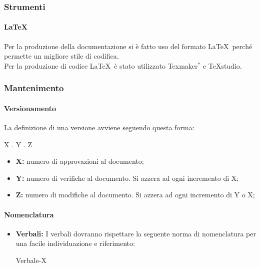 \documentclass[11pt,a4paper]{article}
\begin{document}
{	\subsubsection{Strumenti}
	
	\paragraph{\LaTeX\\}
	 Per la produzione della documentazione si è fatto uso del formato \LaTeX\ perché permette un migliore stile di codifica.\\
	Per la produzione di codice \LaTeX\ è stato utilizzato Texmaker$^*$ e TeXstudio.
	
	\subsubsection{Mantenimento}
	
	\paragraph{Versionamento\\}
	La definizione di una versione avviene seguendo questa forma:
	\begin{center}
		X . Y . Z
	\end{center}
	
	\begin{itemize}
		\item \textbf{X:} numero di approvazioni al documento;
		\item \textbf{Y:} numero di verifiche al documento. Si azzera ad ogni incremento di X;
		\item \textbf{Z:} numero di modifiche al documento. Si azzera ad ogni incremento di Y o X;
	\end{itemize}
	
	
	
	\paragraph{Nomenclatura}
	
	\begin{itemize}
		\item \textbf{Verbali:} I verbali dovranno rispettare la seguente norma di nomenclatura per una facile individuazione e riferimento:
		\begin{center}
			Verbale-X
		\end{center}
		

\end{itemize}}
\end{document}
